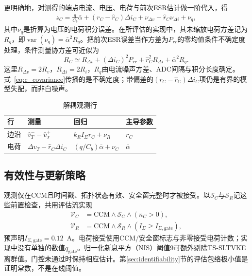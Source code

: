 \documentclass[zihao=5,a4paper]{ctexart}
\newcommand{\TSKF}{TS-SLTVKE}
\newcommand{\alphab}{\bar{\alpha}}
\begin{document}
更明确地，对测得的端点电流、电压、电荷与前次ESR估计做一阶代入，得
\begin{multline}
z_C=\frac{q}{C_b}\alphab+(r_C-\hat r_C)\Delta i_C
+\nu_{\Delta v}-\hat r_C\nu_{\Delta i}+\nu_q,
\label{eq:c_mismatch}
\end{multline}
其中$\nu_q$是折算为电压的电荷积分误差。在所评估的实现中，其未缩放电荷方差记为$R_q$，即$\operatorname{var}(\nu_q)=\alphab^2R_q$。把前次ESR误差当作方差为$P_{rr}$的零均值条件不确定度处理，条件测量协方差可近似为
\begin{equation}
R_C\simeq R_{\Delta v}+(\Delta i_C)^2P_{rr}
+\hat r_C^2R_{\Delta i}+\alphab^2R_q.
\label{eq:c_covariance}
\end{equation}
这里$R_{\Delta v}=2R_v$，$R_{\Delta i}=2R_i$，$R_q$由电流噪声方差、ADC间隔与积分长度确定。式~\eqref{eq:c_covariance}传播的是不确定度；带偏差的$(r_C-\hat r_C)\Delta i_C$项仍是有界的模型失配，而非白噪声。

\begin{table}[t]
\caption{解耦观测行}
\label{tab:observations}
\centering
\begin{tabular}{p{0.9cm}p{2.35cm}p{2.3cm}p{1.5cm}}
\toprule
行 & 测量 & 回归 & 主导参数 \\
\midrule
边沿 & $\hat v_T^- -\hat v_T^+$ & $k_R I_\Sigma r_C+\nu_R$ & $r_C$ \\
电荷 & $\Delta v_T-\hat r_C\Delta i_C$ & $(q/C_b)\alphab+\nu_C$ & $\alphab$ \\
\bottomrule
\end{tabular}
\end{table}

\subsection{有效性与更新策略}

观测仅在CCM且时间戳、拓扑状态有效、安全窗完整时才被接受。以$\mathcal S_C$与$\mathcal S_R$记这些前置检查，共用评估流实现
\begin{equation}
\begin{aligned}
\mathcal V_C&=\mathrm{CCM}\wedge\mathcal S_C\wedge(n_C>0),\\
\mathcal V_R&=\mathrm{CCM}\wedge\mathcal S_R\wedge
(I_\Sigma\ge I_{\Sigma,\mathrm{gate}}),
\end{aligned}
\label{eq:gates}
\end{equation}
预声明$I_{\Sigma,\mathrm{gate}}=0.12$~A。电荷接受使用CCM/安全窗标志与非零接受电荷计数；实现中没有单独的数值$q_{\mathrm{gate}}$。归一化新息平方（NIS）阈值9可额外剔除\TSKF{}离群值。门控未通过时保持相应估计。第\ref{sec:identifiability}节的评估包络极小值是证明常数，不是在线阈值。
\end{document}
